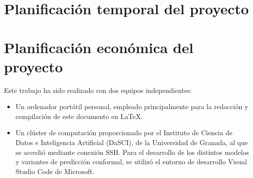 
\section{Planificación temporal del proyecto}



\section{Planificación económica del proyecto}

Este trabajo ha sido realizado con dos equipos independientes: 

\begin{itemize}

    \item Un ordenador portátil personal, empleado principalmente para la redacción y compilación de este documento en \LaTeX.
        
    \item Un clúster de computación proporcionado por el Instituto de Ciencia de Datos e Inteligencia Artificial (DaSCI), de la Universidad de Granada, al que se accedió mediante conexión SSH. Para el desarrollo de los distintos modelos y variantes de predicción conformal, se utilizó el entorno de desarrollo Visual Studio Code de Microsoft.

\end{itemize}

